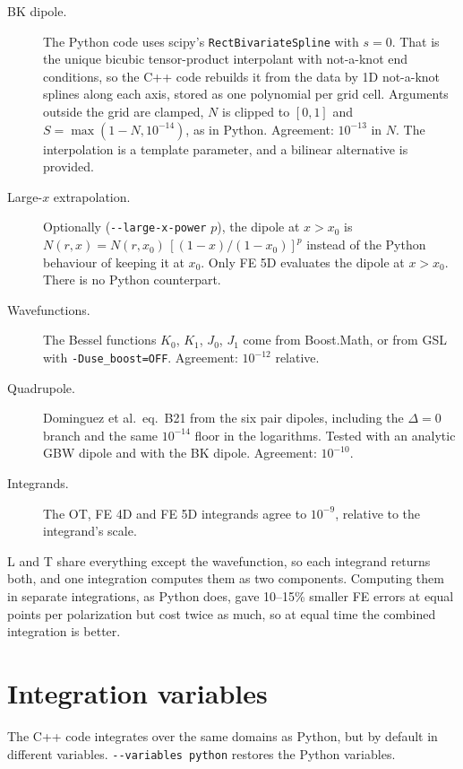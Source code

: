 \documentclass[11pt,a4paper]{article}
\newcommand{\code}[1]{\texttt{#1}}
\newcommand{\opt}[1]{\texttt{-{}-#1}}
\begin{document}
\begin{description}
  \item[BK dipole.] The Python code uses scipy's \code{RectBivariateSpline}
    with $s = 0$. That is the unique bicubic tensor-product interpolant with
    not-a-knot end conditions, so the C++ code rebuilds it from the data by 1D
    not-a-knot splines along each axis, stored as one polynomial per grid cell.
    Arguments outside the grid are clamped, $N$ is clipped to $[0, 1]$ and
    $S = \max(1 - N, 10^{-14})$, as in Python. Agreement: $10^{-13}$ in $N$.
    The interpolation is a template parameter, and a bilinear alternative is
    provided.
  \item[Large-$x$ extrapolation.] Optionally (\opt{large-x-power} $p$), the
    dipole at $x > x_0$ is
    $N(r, x) = N(r, x_0)\,[(1-x)/(1-x_0)]^p$ instead of the Python behaviour
    of keeping it at $x_0$. Only FE 5D evaluates the dipole at $x > x_0$. There
    is no Python counterpart.
  \item[Wavefunctions.] The Bessel functions $K_0$, $K_1$, $J_0$, $J_1$ come
    from Boost.Math, or from GSL with \code{-Duse\_boost=OFF}. Agreement:
    $10^{-12}$ relative.
  \item[Quadrupole.] Dominguez et al.\ eq.~B21 from the six pair dipoles,
    including the $\Delta = 0$ branch and the same $10^{-14}$ floor in the
    logarithms. Tested with an analytic GBW dipole and with the BK dipole.
    Agreement: $10^{-10}$.
  \item[Integrands.] The OT, FE 4D and FE 5D integrands agree to $10^{-9}$,
    relative to the integrand's scale.
\end{description}

L and T share everything except the wavefunction, so each integrand returns
both, and one integration computes them as two components. Computing them in
separate integrations, as Python does, gave 10--15\% smaller FE errors at equal
points per polarization but cost twice as much, so at equal time the combined
integration is better.

\section{Integration variables}
\label{sec:variables}

The C++ code integrates over the same domains as Python, but by default in
different variables. \opt{variables python} restores the Python variables.
\end{document}

